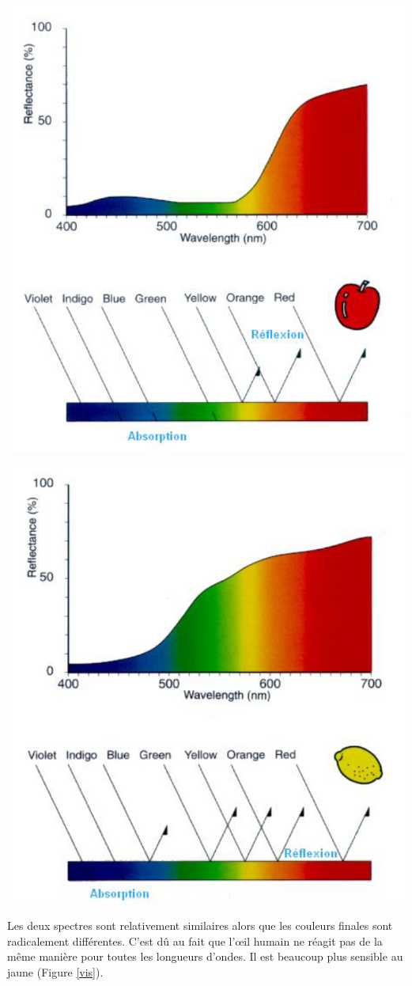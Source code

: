 \documentclass[11pt]{report}
\begin{document}
\begin{minipage}{0.5\linewidth}
\centering
\includegraphics[width=0.8\linewidth]{pom}
\end{minipage}
\begin{minipage}{0.51\linewidth}
\centering
\includegraphics[width=0.8\linewidth]{citron}
\end{minipage}

\vspace{5mm}
Les deux spectres sont relativement similaires alors que les couleurs finales sont radicalement différentes. C'est dû au fait que l'œil humain ne réagit pas de la même manière pour toutes les longueurs d'ondes. Il est beaucoup plus sensible au jaune (Figure \ref{vis}).
\end{document}
